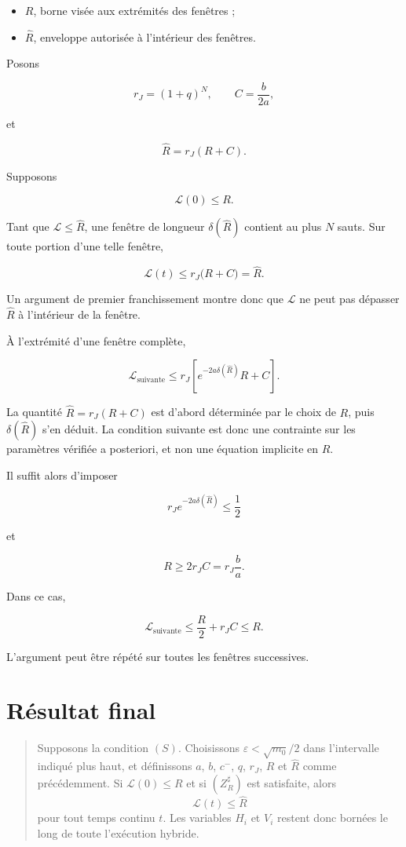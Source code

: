 \begin{itemize}
\item
  \(R\), borne visée aux extrémités des fenêtres ;
\item
  \(\widehat R\), enveloppe autorisée à l'intérieur des fenêtres.
\end{itemize}

Posons

\[
r_J=(1+q)^N,
\qquad
C=\frac{b}{2a},
\]

et

\[
\boxed{
\widehat R
=
r_J(R+C)
}.
\]

Supposons

\[
\mathcal L(0)\leq R.
\]

Tant que \(\mathcal L\leq\widehat R\), une fenêtre de longueur
\(\delta(\widehat R)\) contient au plus \(N\) sauts. Sur toute portion
d'une telle fenêtre,

\[
\mathcal L(t)
\leq
r_J\bigl(R+C\bigr)
=
\widehat R.
\]

Un argument de premier franchissement montre donc que
\(\mathcal L\) ne peut pas dépasser \(\widehat R\) à l'intérieur de la
fenêtre.

À l'extrémité d'une fenêtre complète,

\[
\mathcal L_{\text{suivante}}
\leq
r_J
\left[
e^{-2a\delta(\widehat R)}R+C
\right].
\]

La quantité \(\widehat R=r_J(R+C)\) est d'abord déterminée par le
choix de \(R\), puis \(\delta(\widehat R)\) s'en déduit. La condition
suivante est donc une contrainte sur les paramètres vérifiée a
posteriori, et non une équation implicite en \(R\).

Il suffit alors d'imposer

\[
\boxed{
r_J
e^{-2a\delta(\widehat R)}
\leq
\frac12
}
\]

et

\[
\boxed{
R
\geq
2r_JC
=
r_J\frac{b}{a}
}.
\tag{$Z_R^\sharp$}
\]

Dans ce cas,

\[
\mathcal L_{\text{suivante}}
\leq
\frac{R}{2}
+
r_JC
\leq R.
\]

L'argument peut être répété sur toutes les fenêtres successives.

\section{Résultat final}
\label{annexe-energie-resultat-final}

\begin{quote}
Supposons la condition \((S)\). Choisissons
\(\varepsilon<\sqrt{m_0}/2\) dans l'intervalle indiqué plus haut, et
définissons \(a\), \(b\), \(c^{-}\), \(q\), \(r_J\), \(R\) et
\(\widehat R\) comme précédemment. Si
\(\mathcal L(0)\leq R\) et si \((Z_R^\sharp)\) est satisfaite, alors
\[
\mathcal L(t)\leq\widehat R
\]
pour tout temps continu \(t\). Les variables \(H_i\) et \(V_i\)
restent donc bornées le long de toute l'exécution hybride.
\end{quote}

